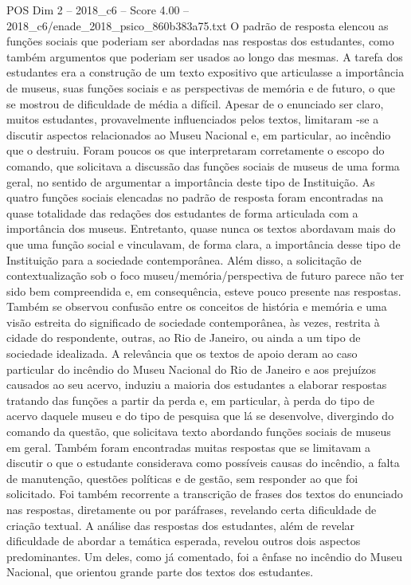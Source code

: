 \begin{textsample}{POS Dim 2 – 2018\_c6 – Score 4.00 – 2018\_c6/enade\_2018\_psico\_860b383a75.txt}
O padrão de resposta elencou as funções sociais que poderiam ser abordadas nas respostas dos estudantes, como também argumentos que poderiam ser usados ao longo das mesmas.
A tarefa dos estudantes era a construção de um texto expositivo que articulasse a importância de museus, suas funções sociais e as perspectivas de memória e de futuro, o que se mostrou de dificuldade de média a difícil.
Apesar de o enunciado ser claro, muitos estudantes, provavelmente influenciados pelos textos, limitaram -se a discutir aspectos relacionados ao Museu Nacional e, em particular, ao incêndio que o destruiu.
Foram poucos os que interpretaram corretamente o escopo do comando, que solicitava a discussão das funções sociais de museus de uma forma geral, no sentido de argumentar a importância deste tipo de Instituição.
As quatro funções sociais elencadas no padrão de resposta foram encontradas na quase totalidade das redações dos estudantes de forma articulada com a importância dos museus.
Entretanto, quase nunca os textos abordavam mais do que uma função social e vinculavam, de forma clara, a importância desse tipo de Instituição para a sociedade contemporânea.
Além disso, a solicitação de contextualização sob o foco museu/memória/perspectiva de futuro parece não ter sido bem compreendida e, em consequência, esteve pouco presente nas respostas.
Também se observou confusão entre os conceitos de história e memória e uma visão estreita do significado de sociedade contemporânea, às vezes, restrita à cidade do respondente, outras, ao Rio de Janeiro, ou ainda a um tipo de sociedade idealizada.
A relevância que os textos de apoio deram ao caso particular do incêndio do Museu Nacional do Rio de Janeiro e aos prejuízos causados ao seu acervo, induziu a maioria dos estudantes a elaborar respostas tratando das funções a partir da perda e, em particular, à perda do tipo de acervo daquele museu e do tipo de pesquisa que lá se desenvolve, divergindo do comando da questão, que solicitava texto abordando funções sociais de museus em geral.
Também foram encontradas muitas respostas que se limitavam a discutir o que o estudante considerava como possíveis causas do incêndio, a falta de manutenção, questões políticas e de gestão, sem responder ao que foi solicitado.
Foi também recorrente a transcrição de frases dos textos do enunciado nas respostas, diretamente ou por paráfrases, revelando certa dificuldade de criação textual.
A análise das respostas dos estudantes, além de revelar dificuldade de abordar a temática esperada, revelou outros dois aspectos predominantes.
Um deles, como já comentado, foi a ênfase no incêndio do Museu Nacional, que orientou grande parte dos textos dos estudantes.

\end{textsample}
